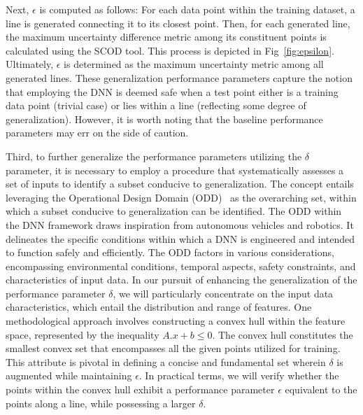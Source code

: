 Next, $\epsilon$ is computed as follows: For each data point within the training dataset, a line is generated connecting it to its closest point. Then, for each generated line, the maximum uncertainty difference metric among its constituent points is calculated using the SCOD tool. This process is depicted in Fig~\ref{fig:epsilon}. Ultimately, $\epsilon$ is determined as the maximum uncertainty metric among all generated lines.   
These generalization performance parameters capture the notion that employing the DNN is deemed safe when a test point either is a training data point (trivial case) or lies within a line (reflecting some degree of generalization). However, it is worth noting that the baseline performance parameters may err on the side of caution. %

Third, to further generalize the performance parameters utilizing the $\delta$ parameter, it is necessary to employ a procedure that systematically assesses a set of inputs to identify a subset conducive to generalization. The concept entails leveraging the Operational Design Domain (ODD)~\cite{saej3016,torfah2022learning,irvine2021two} as the overarching set, within which a subset conducive to generalization can be identified. 
The ODD within the DNN framework draws inspiration from autonomous vehicles and robotics. It delineates the specific conditions within which a DNN is engineered and intended to function safely and efficiently. The ODD factors in various considerations, encompassing environmental conditions, temporal aspects, safety constraints, and characteristics of input data. In our pursuit of enhancing the generalization of the performance parameter $\delta$, we will particularly concentrate on the input data characteristics, which entail the distribution and range of features. One methodological approach involves constructing a convex hull within the feature space, represented by the inequality $A.x+b \leq 0$.  The convex hull constitutes the smallest convex set that encompasses all the given points utilized for training. This attribute is pivotal in defining a concise and fundamental set wherein $\delta$ is augmented while maintaining $\epsilon$.  In practical terms, we will verify whether the points within the convex hull exhibit a performance parameter $\epsilon$ equivalent to the points along a line, while possessing a larger $\delta$. 


